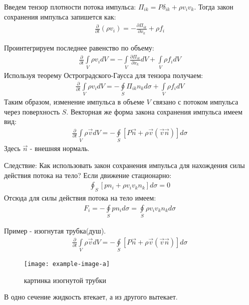 Введем тензор плотности потока импульса: $ \Pi _ { i k } = P \delta _ { i k } + \rho v _ { i } v _ { k } $. Тогда закон сохранения импульса запишется как:
\begin{align*}
\frac { \partial } { \partial t } \left( \rho v _ { i } \right) = - \frac { \partial \Pi _ { i k } } { \partial x _ { k } } + \rho f _ { i }
\end{align*}

Проинтегрируем последнее равенство по объему:
\begin{align*}
\frac { \partial } { \partial t } \int \limits_{ V } \rho v _ { i } d V = - \int \limits_{ V } \frac { \partial \Pi _ { i k } } { \partial x _ { k } } d V + \int \limits_{ V } \rho f _ { i } d V
\end{align*}
Используя теорему Остроградского-Гаусса для тензора получаем:
\begin{align*}
\frac { \partial } { \partial t } \int \limits_ { V } \rho v _ { i } d V = - \oint \limits_ { S } \Pi _ { i k } n _ { k } d \sigma + \int \limits_ { V } \rho f _ { i } d V
\end{align*}
Таким образом, изменение импульса в объеме $V$ связано с потоком импульса через поверхность $S$. Векторная же форма закона сохранения импульса имеем вид:
\begin{align*}
\frac { \partial } { \partial t } \int \limits_ { V } \rho  \vec{v} d V  = - \oint \limits_ { S } [ P \vec { n } + \rho \vec { v } ( \vec { v } \vec{n} ) ]d \sigma
\end{align*}
Здесь $\vec{n}$ - внешняя нормаль.

Следствие: Как использовать закон сохранения импульса для нахождения силы действия потока на тело? Если движение стационарно:
\begin{align*}
\oint _ { S } \left[ p n _ { i } + \rho v _ { i } v _ { k } n _ { k } \right] d \sigma = 0
\end{align*}
Отсюда для силы действия потока на тело имеем:
\begin{align*}
F _ { i } = - \oint \limits_ { S } p n _ { i } d \sigma = \oint \limits_ { S } \rho v _ { i } v _ { k } n _ { k } d \sigma
\end{align*}

Пример - изогнутая трубка(душ).
\begin{align*}
\frac { \partial } { \partial t } \int \limits_ { V } \rho  \vec{v} d V  = - \oint \limits_ { S } [ P \vec { n } + \rho \vec { v } ( \vec { v } \vec{n} ) ]d \sigma
\end{align*}
\begin{figure}[H]
	\centering
	\texttt{[image: example-image-a]}
	\caption{картинка изогнутой трубки}
	\label{fig:figure5}
\end{figure}
В одно сечение жидкость втекает, а из другого вытекает.
